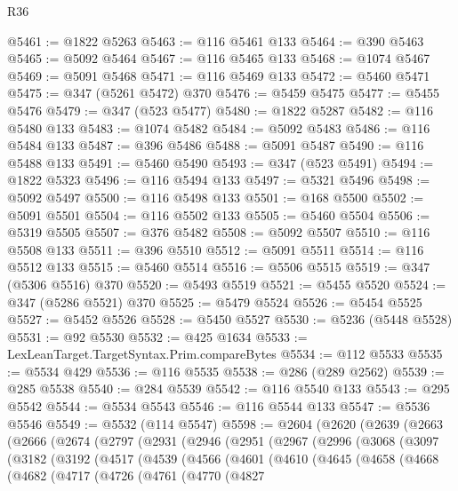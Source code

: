 \begin{lexlean}{R36}
\begin{coremodule}
@5461 := @1822 @5263
@5463 := @116 @5461 @133
@5464 := @390 @5463
@5465 := @5092 @5464
@5467 := @116 @5465 @133
@5468 := @1074 @5467
@5469 := @5091 @5468
@5471 := @116 @5469 @133
@5472 := @5460 @5471
@5475 := @347 (@5261 @5472) @370
@5476 := @5459 @5475
@5477 := @5455 @5476
@5479 := @347 (@523 @5477)
@5480 := @1822 @5287
@5482 := @116 @5480 @133
@5483 := @1074 @5482
@5484 := @5092 @5483
@5486 := @116 @5484 @133
@5487 := @396 @5486
@5488 := @5091 @5487
@5490 := @116 @5488 @133
@5491 := @5460 @5490
@5493 := @347 (@523 @5491)
@5494 := @1822 @5323
@5496 := @116 @5494 @133
@5497 := @5321 @5496
@5498 := @5092 @5497
@5500 := @116 @5498 @133
@5501 := @168 @5500
@5502 := @5091 @5501
@5504 := @116 @5502 @133
@5505 := @5460 @5504
@5506 := @5319 @5505
@5507 := @376 @5482
@5508 := @5092 @5507
@5510 := @116 @5508 @133
@5511 := @396 @5510
@5512 := @5091 @5511
@5514 := @116 @5512 @133
@5515 := @5460 @5514
@5516 := @5506 @5515
@5519 := @347 (@5306 @5516) @370
@5520 := @5493 @5519
@5521 := @5455 @5520
@5524 := @347 (@5286 @5521) @370
@5525 := @5479 @5524
@5526 := @5454 @5525
@5527 := @5452 @5526
@5528 := @5450 @5527
@5530 := @5236 (@5448 @5528)
@5531 := @92 @5530
@5532 := @425 @1634
@5533 := LexLeanTarget.TargetSyntax.Prim.compareBytes
@5534 := @112 @5533
@5535 := @5534 @429
@5536 := @116 @5535
@5538 := @286 (@289 @2562)
@5539 := @285 @5538
@5540 := @284 @5539
@5542 := @116 @5540 @133
@5543 := @295 @5542
@5544 := @5534 @5543
@5546 := @116 @5544 @133
@5547 := @5536 @5546
@5549 := @5532 (@114 @5547)
@5598 := @2604
    (@2620
      (@2639
        (@2663
          (@2666
            (@2674
              (@2797
                (@2931
                  (@2946
                    (@2951
                      (@2967
                        (@2996
                          (@3068
                            (@3097
                              (@3182
                                (@3192
                                  (@4517
                                    (@4539
                                      (@4566
                                        (@4601
                                          (@4610
                                            (@4645
                                              (@4658
                                                (@4668
                                                  (@4682
                                                    (@4717
                                                      (@4726
                                                        (@4761
                                                          (@4770
                                                            (@4827

\end{coremodule}
\end{lexlean}
